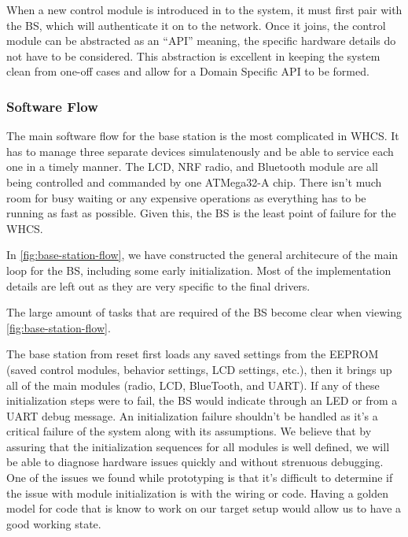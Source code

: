 When a new control module is introduced in to the system, it must first pair
with the BS, which will authenticate it on to the network. Once it joins, the
control module can be abstracted as an ``API'' meaning, the specific hardware
details do not have to be considered. This abstraction is excellent in
keeping the system clean from one-off cases and allow for a Domain Specific API
to be formed.

\subsubsection{Software Flow}
The main software flow for the base station is the most complicated in WHCS. It
has to manage three separate devices simulatenously and be able to service each
one in a timely manner. The LCD, NRF radio, and Bluetooth module are all being
controlled and commanded by one ATMega32-A chip. There isn't much room for busy
waiting or any expensive operations as everything has to be running as fast as
possible. Given this, the BS is the least point of failure for the WHCS.

In \autoref{fig:base-station-flow}, we have constructed the general architecure
of the main loop for the BS, including some early initialization. Most of the
implementation details are left out as they are very specific to the final
drivers.


The large amount of tasks that are required of the BS become clear when viewing
\autoref{fig:base-station-flow}.

The base station from reset first loads any saved settings from the
EEPROM (saved control modules, behavior settings, LCD settings, etc.), then it
brings up all of the main modules (radio, LCD, BlueTooth, and UART). If
any of these initialization steps were to fail, the BS would indicate through
an LED or from a UART debug message. An initialization failure shouldn't be
handled as it's a critical failure of the system along with its assumptions. We
believe that by assuring that the initialization sequences for all modules is
well defined, we will be able to diagnose hardware issues quickly and without
strenuous debugging. One of the issues we found while prototyping is that it's
difficult to determine if the issue with module initialization is with the
wiring or code. Having a golden model for code that is know to work on our
target setup would allow us to have a good working state.

